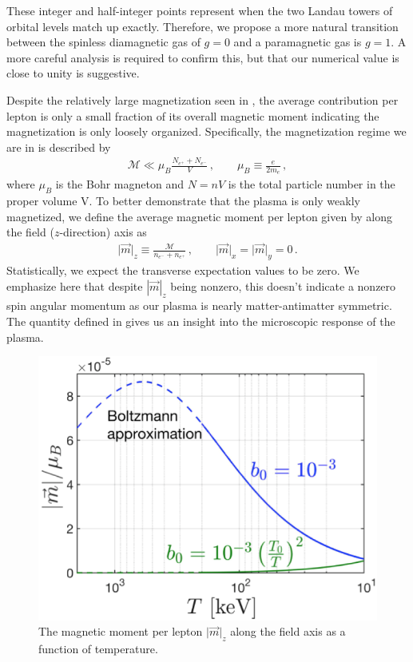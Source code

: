 These integer and half-integer points represent when the two Landau towers of orbital levels match up exactly. Therefore, we propose a more natural transition between the spinless diamagnetic gas of $g=0$ and a paramagnetic gas is $g=1$. A more careful analysis is required to confirm this, but that our numerical value is close to unity is suggestive.

Despite the relatively large magnetization seen in , the average contribution per lepton is only a small fraction of its overall magnetic moment indicating the magnetization is only loosely organized. Specifically, the magnetization regime we are in is described by
\begin{align}
 \label{fractionalmagnetization}
 \mathcal{M}\ll\mu_{B}\frac{N_{e^{+}}+N_{e^{-}}}{V}\,,\qquad\mu_{B}\equiv\frac{e}{2m_{e}}\,,
\end{align}
where $\mu_{B}$ is the Bohr magneton and $N=nV$ is the total particle number in the proper volume V. To better demonstrate that the plasma is only weakly magnetized, we define the average magnetic moment per lepton given by along the field ($z$-direction) axis as
\begin{align}
 \label{momentperlepton}
 \vert\vec{m}\vert_{z}\equiv\frac{\mathcal{M}}{n_{e^{-}}+n_{e^{+}}}\,,\qquad\vert\vec{m}\vert_{x}=\vert\vec{m}\vert_{y}=0\,.
\end{align}
Statistically, we expect the transverse expectation values to be zero. We emphasize here that despite $|\vec{m}|_{z}$ being nonzero, this doesn't indicate a nonzero spin angular momentum as our plasma is nearly matter-antimatter symmetric. The quantity defined in  gives us an insight into the microscopic response of the plasma.

\begin{figure}
 \centering
 \includegraphics[width=0.60\linewidth]{plots/thesis_perlepton.png}
 \caption{The magnetic moment per lepton $\vert\vec{m}\vert_{z}$ along the field axis as a function of temperature. }
 \label{fig:momentperlepton}
\end{figure}

